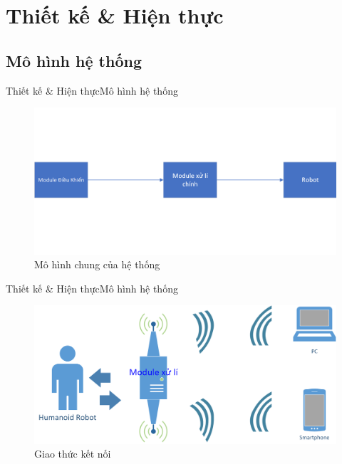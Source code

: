\documentclass[compress, blue, 14pt,hyperref={pdfpagemode=FullScreen}]{beamer}
\begin{document}
\section{Thiết kế \& Hiện thực}
\subsection{Mô hình hệ thống}
\begin{frame}{Thiết kế \& Hiện thực}{Mô hình hệ thống}
\begin{figure}[hbtp]
\centering
\includegraphics[scale=0.65]{images/overview.png}
\caption{Mô hình chung của hệ thống}
\end{figure}
\end{frame}
\begin{frame}{Thiết kế \& Hiện thực}{Mô hình hệ thống}
\begin{figure}[hbtp]
\centering
\includegraphics[scale=0.5]{images/protocol.png}
\caption{Giao thức kết nối}
\end{figure}
\end{frame}
\end{document}
